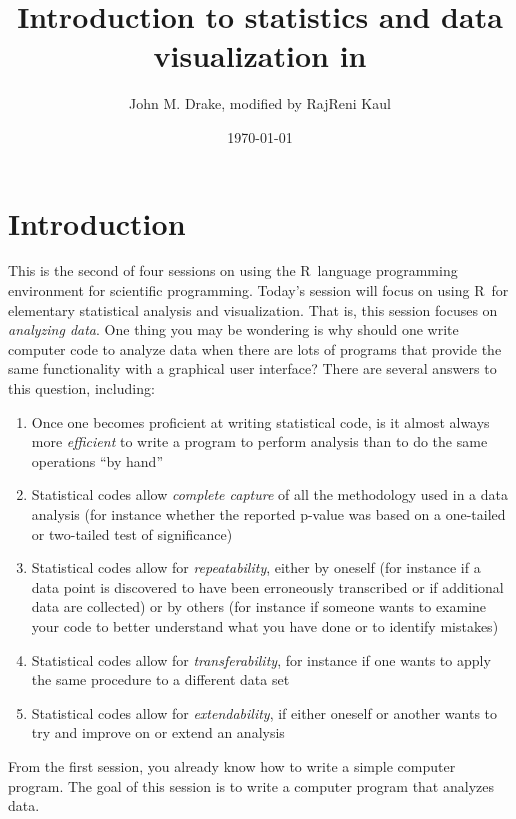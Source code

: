 \documentclass{article}\usepackage[]{graphicx}\usepackage[]{color}
\title{Introduction to statistics and data visualization in \R}
\author{John M. Drake, modified by RajReni Kaul}
\date{
  \today %
}
\newcommand{\R}{\textsf{R}}
\theoremstyle{exercise}
\begin{document}

\maketitle

\section{Introduction}

This is the second of four sessions on using the \R\ language programming environment for scientific programming. Today's session will focus on using \R\ for elementary statistical analysis and visualization. That is, this session focuses on \textit{analyzing data}. One thing you may be wondering is why should one write computer code to analyze data when there are lots of programs that provide the same functionality with a graphical user interface? There are several answers to this question, including: 

\begin{enumerate}
  \item Once one becomes proficient at writing statistical code, is it almost always more \textit{efficient} to write a program to perform analysis than to do the same operations ``by hand''
  \item Statistical codes allow \textit{complete capture} of all the methodology used in a data analysis (for instance whether the reported p-value was based on a one-tailed or two-tailed test of significance)
  \item Statistical codes allow for \textit{repeatability}, either by oneself (for instance if a data point is discovered to have been erroneously transcribed or if additional data are collected) or by others (for instance if someone wants to examine your code to better understand what you have done or to identify mistakes)
  \item Statistical codes allow for \textit{transferability}, for instance if one wants to apply the same procedure to a different data set
  \item Statistical codes allow for \textit{extendability}, if either oneself or another wants to try and improve on or extend an analysis
\end{enumerate}

From the first session, you already know how to write a simple computer program. The goal of this session is to write a computer program that analyzes data.
\end{document}
